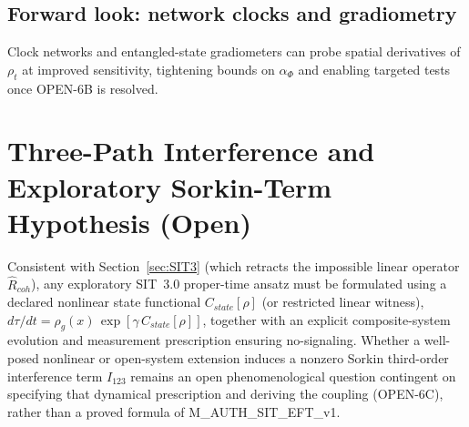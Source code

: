 \documentclass[american,11pt,letterpaper]{article}
\def\mathcal#1{#1}%
\def\mathrm#1{#1}%
\def\texttt#1{#1}%
\def\emph#1{#1}%
\begin{document}
\subsection{Forward look: network clocks and gradiometry}
Clock networks and entangled-state gradiometers can probe spatial derivatives of \(\rho_t\) at improved sensitivity, tightening bounds on \(\alpha_\Phi\) and enabling targeted tests once \texttt{OPEN-6B} is resolved.

\section{Three-Path Interference and Exploratory Sorkin-Term Hypothesis (Open)}
\label{sec:three-path-born}
Consistent with Section~\ref{sec:SIT3} (which retracts the impossible linear operator $\hat{\mathcal{R}}_{\mathrm{coh}}$), any exploratory SIT~3.0 proper-time ansatz must be formulated using a declared \emph{nonlinear} state functional $\mathcal{C}_{\mathrm{state}}[\rho]$ (or restricted linear witness), $d\tau/dt = \rho_g(x)\,\exp[\gamma\,\mathcal{C}_{\mathrm{state}}[\rho]]$, together with an explicit composite-system evolution and measurement prescription ensuring no-signaling. Whether a well-posed nonlinear or open-system extension induces a nonzero Sorkin third-order interference term $I_{123}$ remains an open phenomenological question contingent on specifying that dynamical prescription and deriving the coupling (\texttt{OPEN-6C}), rather than a proved formula of \texttt{M\_AUTH\_SIT\_EFT\_v1}.
\end{document}
